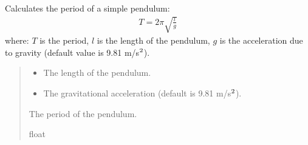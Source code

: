 \documentclass[a4paper,14pt,oneside,english,openany]{sphinxmanual}
\begin{document}
\begin{fulllineitems}
\label{\detokenize{newtest:newtest.pendulum_period}}
\pysigstartsignatures
{}
\pysigstopsignatures
\sphinxAtStartPar
Calculates the period of a simple pendulum:
\begin{equation*}
\begin{split}T = 2 \pi \sqrt{\frac{l}{g}}\end{split}
\end{equation*}
\sphinxAtStartPar
where:
\sphinxhyphen{} \(T\) is the period,
\sphinxhyphen{} \(l\) is the length of the pendulum,
\sphinxhyphen{} \(g\) is the acceleration due to gravity (default value is 9.81 m/s\(\sp{\text{2}}\)).
\begin{quote}\begin{description}
\begin{itemize}
\item {} 
\sphinxAtStartPar
{} \textendash{} The length of the pendulum.

\item {} 
\sphinxAtStartPar
{} \textendash{} The gravitational acceleration (default is 9.81 m/s\(\sp{\text{2}}\)).

\end{itemize}

\sphinxAtStartPar
The period of the pendulum.

\sphinxAtStartPar
float

\end{description}\end{quote}

\end{fulllineitems}

\end{document}

